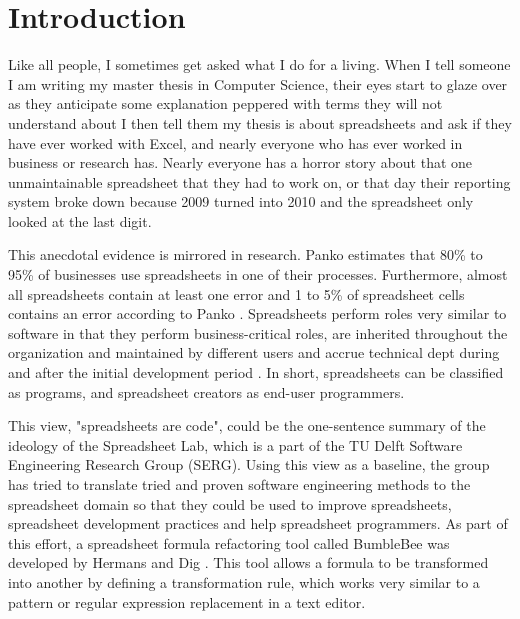 \documentclass[12pt,a4paper,onecolumn,oneside,parskip]{memoir}
\begin{document}


\cleardoublepage

\tableofcontents*

\clearpage


\chapter{Introduction}

Like all people, I sometimes get asked what I do for a living.
When I tell someone I am writing my master thesis in Computer Science, their eyes start to glaze over as they anticipate some explanation peppered with terms they will not understand about 
I then tell them my thesis is about spreadsheets and ask if they have ever worked with Excel, and nearly everyone who has ever worked in business or research has.
Nearly everyone has a horror story about that one unmaintainable spreadsheet that they had to work on, or that day their reporting system broke down because 2009 turned into 2010 and the spreadsheet only looked at the last digit.

This anecdotal evidence is mirrored in research.
Panko \cite{panko2006facing} estimates that 80\% to 95\% of businesses use spreadsheets in one of their processes.
Furthermore, almost all spreadsheets contain at least one error and 1 to 5\% of spreadsheet cells contains an error according to Panko \cite{panko1998we}.
Spreadsheets perform roles very similar to software in that they perform business-critical roles, are inherited throughout the organization and maintained by different users and accrue technical dept during and after the initial development period \cite{panko1998we}.
In short, spreadsheets can be classified as programs, and spreadsheet creators as end-user programmers.

This view, "spreadsheets are code", could be the one-sentence summary of the ideology of the Spreadsheet Lab, which is a part of the TU Delft Software Engineering Research Group (SERG).
Using this view as a baseline, the group has tried to translate tried and proven software engineering methods to the spreadsheet domain so that they could be used to improve spreadsheets, spreadsheet development practices and help spreadsheet programmers.
As part of this effort, a spreadsheet formula refactoring tool called BumbleBee was developed by Hermans and Dig \cite{hermans2014bumblebee}.
This tool allows a formula to be transformed into another by defining a transformation rule, which works very similar to a pattern or regular expression replacement in a text editor.
\end{document}
